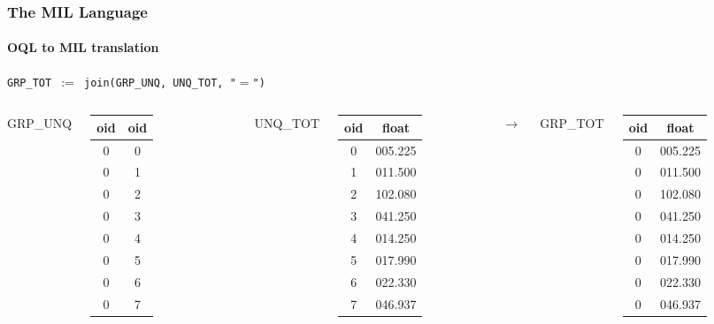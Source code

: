 \documentclass{beamer}
\begin{document}
\begin{frame}
  \frametitle{The MIL Language}
  \framesubtitle{OQL to MIL translation}

  \begin{block}{}
  {\tt GRP\_TOT $:=$ join(GRP\_UNQ, UNQ\_TOT, "$=$")}
  \end{block}

  \begin{columns}

  \column{2cm}

  GRP\_UNQ
  \begin{tabular}{|c|c|}
    \hline
    oid & oid \\
    \hline
    0 & 0 \\
    0 & 1 \\
    0 & 2 \\
    0 & 3 \\
    0 & 4 \\
    0 & 5 \\
    0 & 6 \\
    0 & 7 \\
    \hline
  \end{tabular}

  \column{1.5cm}

  UNQ\_TOT
  \begin{tabular}{|c|c|}
    \hline
    oid & float \\
    \hline
    0 & 005.225 \\
    1 & 011.500 \\
    2 & 102.080 \\
    3 & 041.250 \\
    4 & 014.250 \\
    5 & 017.990 \\
    6 & 022.330 \\
    7 & 046.937 \\
    \hline
  \end{tabular}

  \column{0.5cm}

  $\longrightarrow$

  \column{1cm}

  GRP\_TOT
  \begin{tabular}{|c|c|}
    \hline
    oid & float \\
    \hline
    0 & 005.225 \\
    0 & 011.500 \\
    0 & 102.080 \\
    0 & 041.250 \\
    0 & 014.250 \\
    0 & 017.990 \\
    0 & 022.330 \\
    0 & 046.937 \\
    \hline
  \end{tabular}

  \end{columns}

\end{frame}
\end{document}
